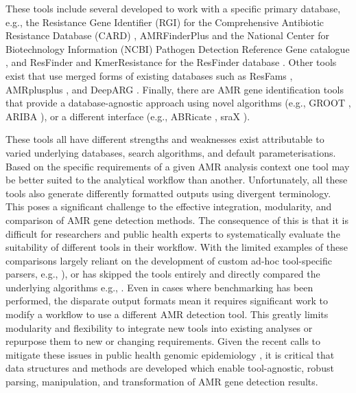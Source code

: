 These tools include several developed to work with a specific primary database, e.g., the Resistance Gene Identifier (RGI) for the Comprehensive Antibiotic Resistance Database (CARD) \cite{alcock_card_2020}, AMRFinderPlus and the National Center for Biotechnology Information (NCBI) Pathogen Detection Reference Gene catalogue \cite{feldgarden_validating_2019}, and ResFinder and KmerResistance \cite{clausen_benchmarking_2016} for the ResFinder database \cite{zankari_identification_2012}.  Other tools exist that use merged forms of existing databases such as ResFams \cite{gibson_improved_2015}, AMRplusplus \cite{doster_megares_2020}, and DeepARG \cite{arango-argoty_deeparg_2018}. Finally, there are AMR gene identification tools that provide a database-agnostic approach using novel algorithms (e.g., GROOT \cite{rowe_indexed_2018}, ARIBA \cite{hunt_ariba_2017}), or a different interface (e.g., ABRicate \cite{torsten_seeman_abricate_2020}, sraX \cite{panunzi_srax_2020}). 

These tools all have different strengths and weaknesses exist attributable to varied underlying databases, search algorithms, and default parameterisations. Based on the specific requirements of a given AMR analysis context one tool may be better suited to the analytical workflow than another.    
Unfortunately, all these tools also generate differently formatted outputs using divergent terminology. This poses a significant challenge to the effective integration, modularity, and comparison of AMR gene detection methods. The consequence of this is that it is difficult for researchers and public health experts to systematically evaluate the suitability of different tools in their workflow. With the limited examples of these comparisons largely reliant on the development of custom ad-hoc tool-specific parsers, e.g., \cite{feldgarden_validating_2019, hunt_ariba_2017}), or has skipped the tools entirely and directly compared the underlying algorithms e.g., \cite{mccall_comparative_2018}. Even in cases where benchmarking has been performed, the disparate output formats mean it requires significant work to modify a workflow to use a different AMR detection tool. This greatly limits modularity and flexibility to integrate new tools into existing analyses or repurpose them to new or changing requirements.  Given the recent calls to mitigate these issues in public health genomic epidemiology \cite{black_ten_2020}, it is critical that data structures and methods are developed which enable tool-agnostic, robust parsing, manipulation, and transformation of AMR gene detection results.

